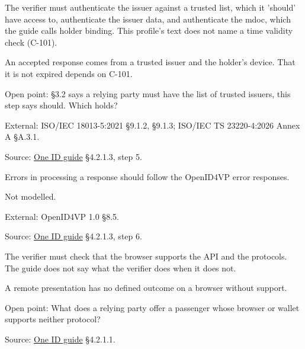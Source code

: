 \begin{definition}
  \label{def:c78}
  \notready
  The verifier must authenticate the issuer against a trusted list, which it
  'should' have access to, authenticate the issuer data, and authenticate the
  mdoc, which the guide calls holder binding. This profile's text does not
  name a time validity check (C-101).

  An accepted response comes from a trusted issuer and the holder's device.
  That it is not expired depends on C-101.

  Open point: §3.2 says a relying party must have the list of trusted
  issuers, this step says should. Which holds?

  External: ISO/IEC 18013-5:2021 §9.1.2, §9.1.3; ISO/IEC TS 23220-4:2026
  Annex A §A.3.1.

  Source:
  \href{https://standards.atlassian.net/wiki/spaces/OneID/pages/2947416082/Technical+Implementation+Guide}{One
  ID guide} §4.2.1.3, step 5.
\end{definition}

\begin{definition}
  \label{def:c79}
  Errors in processing a response should follow the OpenID4VP error
  responses.

  Not modelled.

  External: OpenID4VP 1.0 §8.5.

  Source:
  \href{https://standards.atlassian.net/wiki/spaces/OneID/pages/2947416082/Technical+Implementation+Guide}{One
  ID guide} §4.2.1.3, step 6.
\end{definition}

\begin{definition}
  \label{def:c99}
  \notready
  The verifier must check that the browser supports the API and the
  protocols. The guide does not say what the verifier does when it does not.

  A remote presentation has no defined outcome on a browser without support.

  Open point: What does a relying party offer a passenger whose browser or
  wallet supports neither protocol?

  Source:
  \href{https://standards.atlassian.net/wiki/spaces/OneID/pages/2947416082/Technical+Implementation+Guide}{One
  ID guide} §4.2.1.1.
\end{definition}

